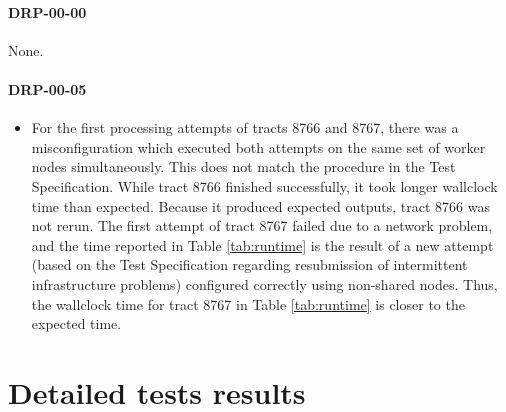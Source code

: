 \documentclass[DM,lsstdraft,STR,toc]{lsstdoc}
\begin{document}
\paragraph{DRP-00-00}

None.

\paragraph{DRP-00-05}
\label{sect:deviation-drp-00-05}

\begin{itemize}
  \item{
    For the first processing attempts of tracts 8766 and 8767, there was a misconfiguration which executed both attempts on the same set of worker nodes simultaneously.
    This does not match the procedure in the Test Specification.
    While tract 8766 finished successfully, it took longer wallclock time than expected.
    Because it produced expected outputs, tract 8766 was not rerun.
    The first attempt of tract 8767 failed due to a network problem, and the time reported in Table \ref{tab:runtime} is the result of a new attempt (based on the Test Specification regarding resubmission of intermittent infrastructure problems) configured correctly using non-shared nodes.
    Thus, the wallclock time for tract 8767 in Table \ref{tab:runtime} is closer to the expected
	time.
  }
\end{itemize}

\appendix

\newpage
\section{Detailed tests results}






\end{document}
